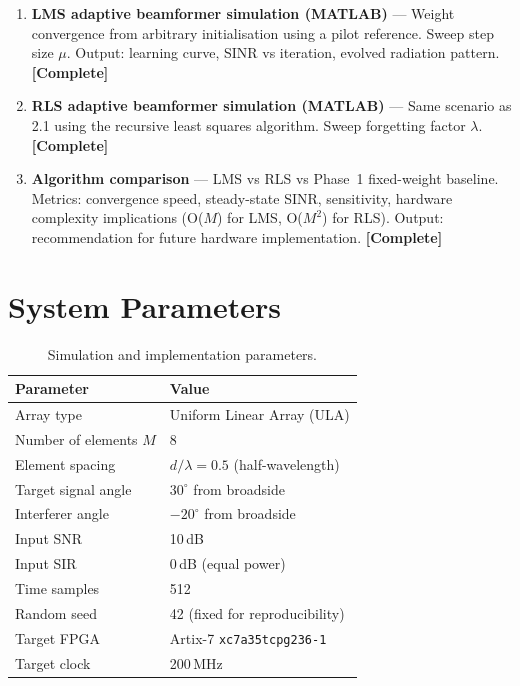 \documentclass[11pt,a4paper]{article}
\begin{document}
\begin{enumerate}[leftmargin=2em, label=\textbf{2.\arabic*.}]
    \item \textbf{LMS adaptive beamformer simulation (MATLAB)} ---
          Weight convergence from arbitrary initialisation using a pilot
          reference. Sweep step size $\mu$. Output: learning curve, SINR
          vs iteration, evolved radiation pattern.
          \textcolor{passgreen}{\textbf{[Complete]}}

    \item \textbf{RLS adaptive beamformer simulation (MATLAB)} ---
          Same scenario as 2.1 using the recursive least squares algorithm.
          Sweep forgetting factor $\lambda$.
          \textcolor{passgreen}{\textbf{[Complete]}}

    \item \textbf{Algorithm comparison} ---
          LMS vs RLS vs Phase~1 fixed-weight baseline. Metrics: convergence
          speed, steady-state SINR, sensitivity, hardware complexity
          implications (O($M$) for LMS, O($M^2$) for RLS). Output:
          recommendation for future hardware implementation.
          \textcolor{passgreen}{\textbf{[Complete]}}
\end{enumerate}

\section{System Parameters}

\begin{table}[H]
\centering
\begin{tabular}{ll}
\toprule
\textbf{Parameter} & \textbf{Value} \\
\midrule
Array type              & Uniform Linear Array (ULA) \\
Number of elements $M$  & 8 \\
Element spacing         & $d/\lambda = 0.5$ (half-wavelength) \\
Target signal angle     & $30^\circ$ from broadside \\
Interferer angle        & $-20^\circ$ from broadside \\
Input SNR               & 10\,dB \\
Input SIR               & 0\,dB (equal power) \\
Time samples            & 512 \\
Random seed             & 42 (fixed for reproducibility) \\
Target FPGA             & Artix-7 \texttt{xc7a35tcpg236-1} \\
Target clock            & 200\,MHz \\
\bottomrule
\end{tabular}
\caption{Simulation and implementation parameters.}
\end{table}
\end{document}
